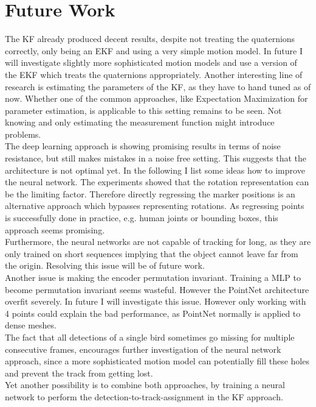 \documentclass[12pt,a4paper]{article}
\begin{document}
\section{Future Work}
\label{future_work}

The KF already produced decent results, despite not treating the quaternions correctly, only being an EKF and using a very simple motion model. In future I will investigate slightly more sophisticated motion models and use a version of the EKF which treats the quaternions appropriately. Another interesting line of research is estimating the parameters of the KF, as they have to hand tuned as of now. Whether one of the common approaches, like Expectation Maximization for parameter estimation, is applicable to this setting remains to be seen. Not knowing and only estimating the measurement function might introduce problems. \\
The deep learning approach is showing promising results in terms of noise resistance, but still makes mistakes in a noise free setting. This suggests that the architecture is not optimal yet. In the following I list some ideas how to improve the neural network. The experiments showed that the rotation representation can be the limiting factor. Therefore directly regressing the marker positions is an alternative approach which bypasses representing rotations. As regressing points is successfully done in practice, e.g. human joints or bounding boxes, this approach seems promising. \\
Furthermore, the neural networks are not capable of tracking for long, as they are only trained on short sequences implying that the object cannot leave far from the origin. Resolving this issue will be of future work. \\
Another issue is making the encoder permutation invariant. Training a MLP to become permutation invariant seems wasteful. However the PointNet architecture overfit severely. In future I will investigate this issue. However only working with 4 points could explain the bad performance, as PointNet normally is applied to dense meshes.\\
The fact that all detections of a single bird sometimes go missing for multiple consecutive frames, encourages further investigation of the neural network approach, since a more sophisticated motion model can potentially fill these holes and prevent the track from getting lost. \\
Yet another possibility is to combine both approaches, by training a neural network to perform the detection-to-track-assignment in the KF approach.
\end{document}
